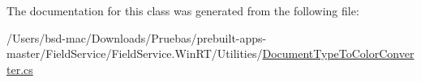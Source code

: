 The documentation for this class was generated from the following file\+:\begin{DoxyCompactItemize}
\item 
/\+Users/bsd-\/mac/\+Downloads/\+Pruebas/prebuilt-\/apps-\/master/\+Field\+Service/\+Field\+Service.\+Win\+R\+T/\+Utilities/\hyperlink{_document_type_to_color_converter_8cs}{Document\+Type\+To\+Color\+Converter.\+cs}\end{DoxyCompactItemize}
